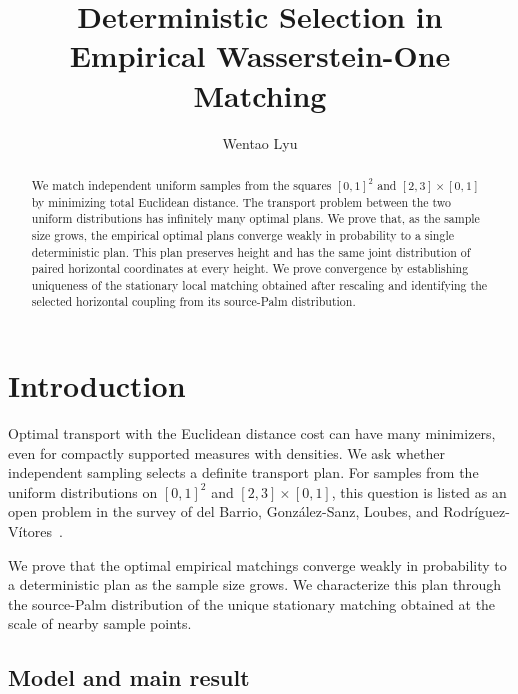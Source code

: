 \documentclass[11pt,reqno]{amsart}
\title[Empirical Wasserstein-One Matching]
{Deterministic Selection in Empirical Wasserstein-One Matching}
\author{Wentao Lyu}
\affil{Shanghai Center for Mathematical Sciences,
Fudan University}
\date{}
\theoremstyle{definition}
\theoremstyle{remark}
\numberwithin{equation}{section}
\begin{document}
\begin{abstract}
We match independent uniform samples from the squares \([0,1]^2\) and
\([2,3]\times[0,1]\) by minimizing total Euclidean distance. The transport
problem between the two uniform distributions has infinitely many optimal
plans. We prove that, as the sample size grows, the empirical optimal plans
converge weakly in probability to a single deterministic plan. This plan
preserves height and has the same joint distribution of paired horizontal
coordinates at every height. We prove convergence by establishing uniqueness
of the stationary local matching obtained after rescaling and identifying
the selected horizontal coupling from its source-Palm distribution.
\end{abstract}

\maketitle

\section{Introduction}
\label{sec:introduction}

Optimal transport with the Euclidean distance cost can have many
minimizers, even for compactly supported measures with densities. We ask
whether independent sampling selects a definite transport plan. For samples
from the uniform distributions on \([0,1]^2\) and
\([2,3]\times[0,1]\), this question is listed as an open problem in the
survey of del Barrio, Gonz\'alez-Sanz, Loubes, and
Rodr\'iguez-V\'itores~\cite[Section~7, Problem~4]{delBarrioEtAl2025}.

We prove that the optimal empirical matchings converge weakly in probability
to a deterministic plan as the sample size grows. We characterize this plan
through the source-Palm distribution of the unique stationary matching
obtained at the scale of nearby sample points.

\subsection{Model and main result}
\end{document}

